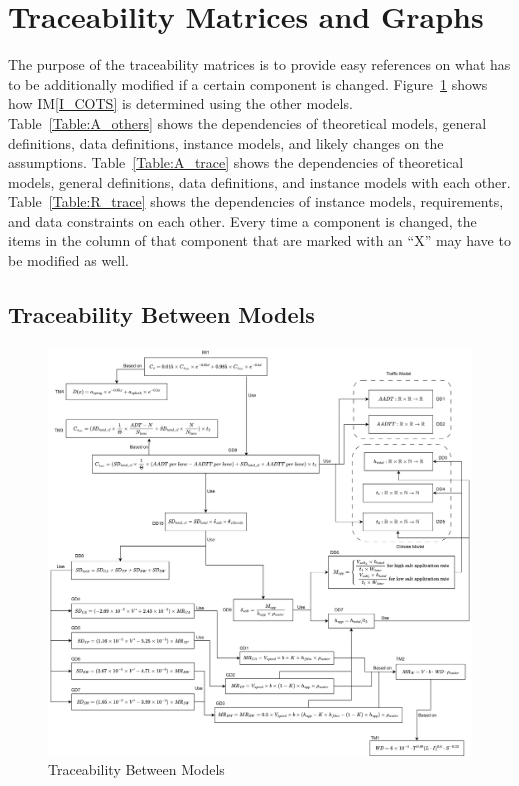 \documentclass[12pt]{article}
\newcommand{\iref}[1]{IM\ref{#1}}
\begin{document}
\section{Traceability Matrices and Graphs}

The purpose of the traceability matrices is to provide easy references on what
has to be additionally modified if a certain component is changed.  Figure~\ref{Fig_TraceabilityBetweenModels} shows how \iref{I_COTS} is determined using the other models.
\\
Table~\ref{Table:A_others} shows the dependencies of theoretical models, general definitions, data definitions, instance models, and likely changes on the assumptions. Table~\ref{Table:A_trace} shows the dependencies of theoretical models, general definitions, data definitions, and instance models with each other. Table~\ref{Table:R_trace} shows the dependencies of instance models, requirements, and data constraints on each other. Every time a component is changed, the items in the column of that component that are marked
with an ``X'' may have to be modified as well. 

\subsection{Traceability Between Models}

\begin{figure}[h!]
\begin{center}
 \includegraphics[width=\textwidth]{TraceabilityBetweenModels}
\caption{Traceability Between Models}
\label{Fig_TraceabilityBetweenModels} 
\end{center}
\end{figure}
\end{document}
